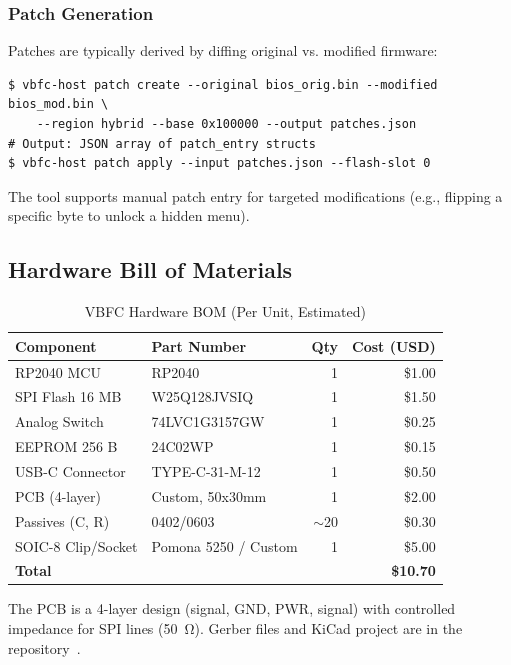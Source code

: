 \subsubsection{Patch Generation}
Patches are typically derived by diffing original vs. modified firmware:
\begin{lstlisting}[style=vbfcStyle, caption={Patch Creation from Binary Diff}, label={lst:patch_gen}]
$ vbfc-host patch create --original bios_orig.bin --modified bios_mod.bin \
    --region hybrid --base 0x100000 --output patches.json
# Output: JSON array of patch_entry structs
$ vbfc-host patch apply --input patches.json --flash-slot 0
\end{lstlisting}

The tool supports manual patch entry for targeted modifications (e.g., flipping a specific byte to unlock a hidden menu).

\subsection{Hardware Bill of Materials}
\begin{table}[h]
\centering
\caption{VBFC Hardware BOM (Per Unit, Estimated)}
\label{tab:bom}
\begin{tabular}{@{}llrr@{}}
\toprule
\textbf{Component} & \textbf{Part Number} & \textbf{Qty} & \textbf{Cost (USD)} \\
\midrule
RP2040 MCU        & RP2040               & 1 & \$1.00 \\
SPI Flash 16 MB   & W25Q128JVSIQ         & 1 & \$1.50 \\
Analog Switch     & 74LVC1G3157GW        & 1 & \$0.25 \\
EEPROM 256 B      & 24C02WP              & 1 & \$0.15 \\
USB-C Connector   & TYPE-C-31-M-12       & 1 & \$0.50 \\
PCB (4-layer)     & Custom, 50x30mm      & 1 & \$2.00 \\
Passives (C, R)   & 0402/0603            & $\sim$20 & \$0.30 \\
SOIC-8 Clip/Socket& Pomona 5250 / Custom & 1 & \$5.00 \\
\midrule
\textbf{Total}      &                      &    & \textbf{\$10.70} \\
\bottomrule
\end{tabular}
\end{table}

The \ac{PCB} is a 4-layer design (signal, GND, PWR, signal) with controlled impedance for \ac{SPI} lines (\SI{50}{\ohm}). Gerber files and KiCad project are in the repository~\cite{vbfc-github}.